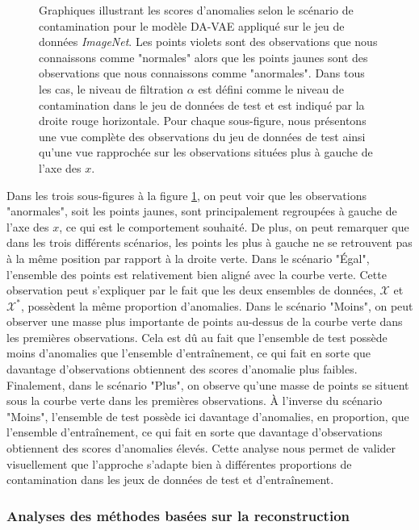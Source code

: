 \begin{figure}[htb]
	\caption[Graphiques illustrant les scores d'anomalies selon le scénario de contamination pour le modèle DA-VAE appliqué sur le jeu de données \textit{ImageNet}.]{\DIFaddendFL Graphiques illustrant les scores d'anomalies selon le scénario de contamination pour le modèle DA-VAE appliqué sur le jeu de données \textit{ImageNet}. Les points violets sont des observations que nous connaissons comme "normales" alors que les points jaunes sont des observations que nous connaissons comme "anormales". Dans tous les cas, le niveau de filtration $\alpha$ est défini comme le niveau de contamination dans le jeu de données de test et est indiqué par la droite rouge horizontale. Pour chaque sous-figure, nous présentons une vue complète des observations du jeu de données de test ainsi qu'une vue rapprochée sur les observations situées plus à gauche de l'axe des $x$.} 
	\label{fig:pvalues_scenarios}
\end{figure}

Dans les trois sous-figures à la figure \ref{fig:pvalues_scenarios}, on peut voir que les observations "anormales", soit les points jaunes, sont principalement regroupées à gauche de l'axe des $x$, ce qui est le comportement souhaité. De plus, on peut remarquer que dans les trois différents scénarios, les points les plus à gauche ne se retrouvent pas à la même position par rapport à la droite verte. Dans le scénario "Égal", l'ensemble des points est relativement bien aligné avec la courbe verte. Cette observation peut s'expliquer par le fait que les deux ensembles de données, $\mathcal{X}$ et $\mathcal{X^*}$, possèdent la même proportion d'anomalies. Dans le scénario "Moins", on peut observer une masse plus importante de points au-dessus de la courbe verte dans les premières observations. Cela est dû au fait que l'ensemble de test possède moins d'anomalies que l'ensemble d'entraînement, ce qui fait en sorte que davantage d'observations obtiennent des scores d'anomalie plus faibles. Finalement, dans le scénario "Plus", on observe qu'une masse de points se situent sous la courbe verte dans les premières observations. À l'inverse du scénario "Moins", l'ensemble de test possède ici davantage d'anomalies, en proportion, que l'ensemble d'entraînement, ce qui fait en sorte que davantage d'observations obtiennent des scores d'anomalies élevés. Cette analyse nous permet de valider visuellement que l'approche s'adapte bien à différentes proportions de contamination dans les jeux de données de test et d'entraînement.

\subsubsection{Analyses des méthodes basées sur la reconstruction} \label{imagenet:reconsruction}

